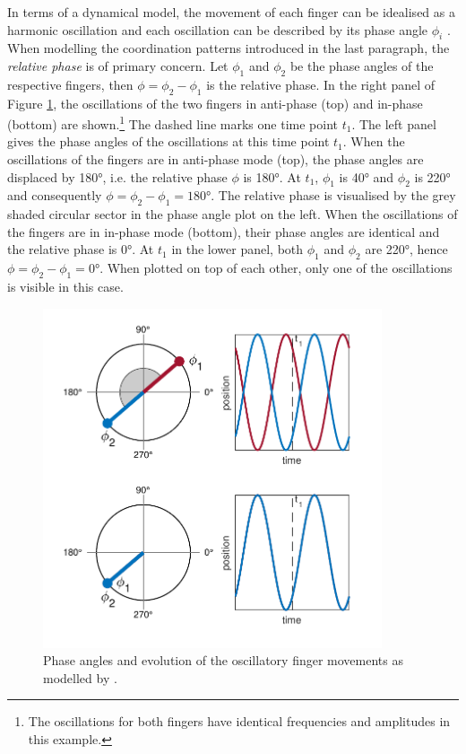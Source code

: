 In terms of a dynamical model, the movement of each finger can be idealised as a harmonic oscillation and each oscillation can be described by its phase angle $\phi_i$ \citep{HakenKelsoBunz1985}. When modelling the coordination patterns introduced in the last paragraph, the \emph{relative phase} is of primary concern. Let $\phi_1$ and $\phi_2$ be the phase angles of the respective fingers, then $\phi = \phi_2 - \phi_1$ is the relative phase. In the right panel of Figure \ref{fig:hkb_phase_position}, the oscillations of the two fingers in anti-phase (top) and in-phase (bottom) are shown.\footnote{The oscillations for both fingers have identical frequencies and amplitudes in this example.} The dashed line marks one time point $t_1$. The left panel gives the phase angles of the oscillations at this time point $t_1$. When the oscillations of the fingers are in anti-phase mode (top), the phase angles are displaced by 180°, i.e. the relative phase $\phi$ is 180°. At $t_1$, $\phi_1$ is 40° and $\phi_2$ is 220° and consequently $\phi=\phi_2-\phi_1=180$°. The relative phase is visualised by the grey shaded circular sector in the phase angle plot on the left. When the oscillations of the fingers are in in-phase mode (bottom), their phase angles are identical and the relative phase is 0°. At $t_1$ in the lower panel, both $\phi_1$ and $\phi_2$ are 220°, hence $\phi = \phi_2 - \phi_1 = 0$°. When plotted on top of each other, only one of the oscillations is visible in this case. 

\begin{figure}[t]
\includegraphics[width=10cm]{figures/ch3/phase_position_hkb_fingers.pdf}
\caption{Phase angles and evolution of the oscillatory finger movements as modelled by \citet{HakenKelsoBunz1985}.}
\label{fig:hkb_phase_position}
\end{figure}

